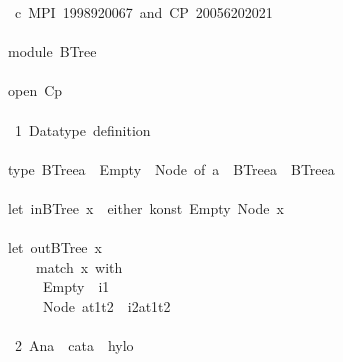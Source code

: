 \documentclass[a4paper]{article}
\begin{document}
\begin{tabbing}\ttfamily
~~c~MPI~1998920067~and~CP~20056202021\\
\ttfamily ~\\
\ttfamily ~module~BTree\\
\ttfamily ~\\
\ttfamily ~open~Cp\\
\ttfamily ~\\
\ttfamily ~~1~Datatype~definition~\\
\ttfamily ~\\
\ttfamily ~type~BTreea~~Empty~~Node~of~a~~BTreea~~BTreea\\
\ttfamily ~\\
\ttfamily ~let~inBTree~x~~either~konst~Empty~Node~x\\
\ttfamily ~\\
\ttfamily ~let~outBTree~x~\\
\ttfamily ~~~~~match~x~with\\
\ttfamily ~~~~~~Empty~~i1\\
\ttfamily ~~~~~~Node~at1t2~~i2at1t2\\
\ttfamily ~~~~~\\
\ttfamily ~~2~Ana~~cata~~hylo~\\

\end{tabbing}
\end{document}
